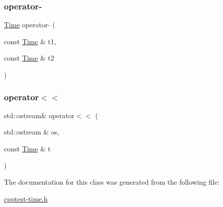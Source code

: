 \mbox{\label{class_test_1_1_time_a09225563b0b317910b26c550ba74de64}} 
\subsubsection{\texorpdfstring{operator-\/}{operator-}}
{\footnotesize\ttfamily \mbox{\hyperlink{class_test_1_1_time}{Time}} operator-\/ (\begin{DoxyParamCaption}\item[{const \mbox{\hyperlink{class_test_1_1_time}{Time}} \&}]{t1,  }\item[{const \mbox{\hyperlink{class_test_1_1_time}{Time}} \&}]{t2 }\end{DoxyParamCaption})\hspace{0.3cm}{\ttfamily [friend]}}

\mbox{\label{class_test_1_1_time_a0287b008277738b9882ed96467e8b4f8}} 
\subsubsection{\texorpdfstring{operator$<$$<$}{operator<<}}
{\footnotesize\ttfamily std\+::ostream\& operator$<$$<$ (\begin{DoxyParamCaption}\item[{std\+::ostream \&}]{os,  }\item[{const \mbox{\hyperlink{class_test_1_1_time}{Time}} \&}]{t }\end{DoxyParamCaption})\hspace{0.3cm}{\ttfamily [friend]}}



The documentation for this class was generated from the following file\+:\begin{DoxyCompactItemize}
\item 
\mbox{\hyperlink{cpptest-time_8h}{cpptest-\/time.\+h}}\end{DoxyCompactItemize}

